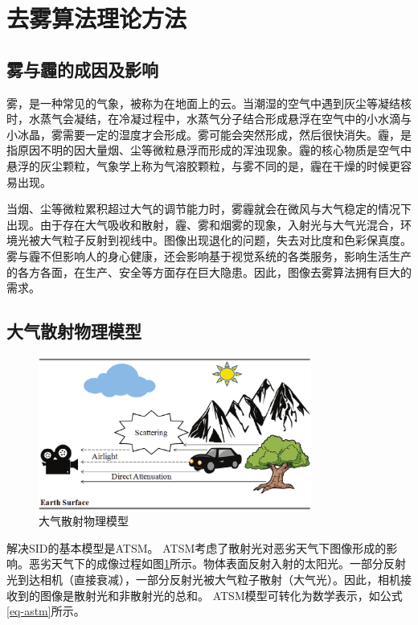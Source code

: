 \section{去雾算法理论方法}
\label{s2}

\subsection{雾与霾的成因及影响}
雾，是一种常见的气象，被称为在地面上的云。当潮湿的空气中遇到灰尘等凝结核时，水蒸气会凝结，在冷凝过程中，水蒸气分子结合形成悬浮在空气中的小水滴与小冰晶，雾需要一定的湿度才会形成。雾可能会突然形成，然后很快消失。霾，是指原因不明的因大量烟、尘等微粒悬浮而形成的浑浊现象。霾的核心物质是空气中悬浮的灰尘颗粒，气象学上称为气溶胶颗粒，与雾不同的是，霾在干燥的时候更容易出现。

当烟、尘等微粒累积超过大气的调节能力时，雾霾就会在微风与大气稳定的情况下出现。由于存在大气吸收和散射，霾、雾和烟雾的现象，入射光与大气光混合，环境光被大气粒子反射到视线中。图像出现退化的问题，失去对比度和色彩保真度。雾与霾不但影响人的身心健康，还会影响基于视觉系统的各类服务，影响生活生产的各方各面，在生产、安全等方面存在巨大隐患。因此，图像去雾算法拥有巨大的需求。

\subsection{大气散射物理模型}
\label{subsec-atsm}
\begin{figure}[htbp]
    \centering
    \includegraphics[width=0.8\textwidth]{./imgs/g167.png}
    \caption{大气散射物理模型}
    \label{fig-astm}
 \end{figure}

解决SID的基本模型是ATSM\cite{narasimhan2004models}。 ATSM考虑了散射光对恶劣天气下图像形成的影响。恶劣天气下的成像过程如图\ref{fig-astm}所示。物体表面反射入射的太阳光。一部分反射光到达相机（直接衰减），一部分反射光被大气粒子散射（大气光）。因此，相机接收到的图像是散射光和非散射光的总和。 ATSM模型可转化为数学表示\cite{narasimhan2004models}，如公式\eqref{eq-astm}所示。

